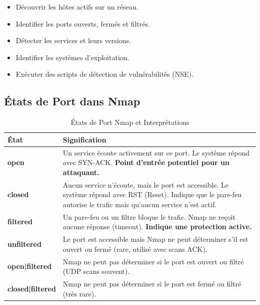 \documentclass[12pt,a4paper,openany]{report}
\newcommand{\tableheadcolor}{\rowcolor{tableheadbg}}
\begin{document}
	\begin{itemize}
		\item Découvrir les hôtes actifs sur un réseau.
		\item Identifier les ports ouverts, fermés et filtrés.
		\item Détecter les services et leurs versions.
		\item Identifier les systèmes d'exploitation.
		\item Exécuter des scripts de détection de vulnérabilités (NSE).
	\end{itemize}
	
	\subsection{États de Port dans Nmap}
	\begin{table}[H]
		\centering
		\renewcommand{\arraystretch}{1.6}
		\setlength{\arrayrulewidth}{0.5pt}
		\begin{tabular}{>{\bfseries}p{3cm} p{11cm}}
			\arrayrulecolor{tableborder}
			\hline
			\tableheadcolor
			\textcolor{tableheadfg}{\textbf{État}} &
			\textcolor{tableheadfg}{\textbf{Signification}} \\
			\hline
			\rowcolor{tablerowalt}
			open & Un service écoute activement sur ce port. Le système répond avec SYN-ACK. \textbf{Point d'entrée potentiel pour un attaquant.} \\
			
			closed & Aucun service n'écoute, mais le port est accessible. Le système répond avec RST (Reset). Indique que le pare-feu autorise le trafic mais qu'aucun service n'est actif. \\
			
			\rowcolor{tablerowalt}
			filtered & Un pare-feu ou un filtre bloque le trafic. Nmap ne reçoit aucune réponse (timeout). \textbf{Indique une protection active.} \\
			
			unfiltered & Le port est accessible mais Nmap ne peut déterminer s'il est ouvert ou fermé (rare, utilisé avec scans ACK). \\
			
			\rowcolor{tablerowalt}
			open|filtered & Nmap ne peut pas déterminer si le port est ouvert ou filtré (UDP scans souvent). \\
			
			closed|filtered & Nmap ne peut pas déterminer si le port est fermé ou filtré (très rare). \\
			\hline
		\end{tabular}
		\caption{États de Port Nmap et Interprétations}
	\end{table}
	
\end{document}
